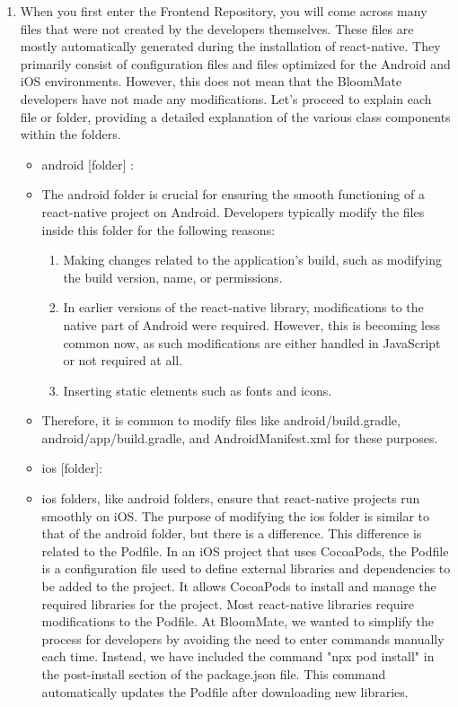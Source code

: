 \documentclass[conference, a4paper]{IEEEtran}
\begin{document}
\begin{enumerate}
\begin{enumerate}
        \item[] When you first enter the Frontend Repository, you will come across many files that were not created by the developers themselves. These files are mostly automatically generated during the installation of react-native. They primarily consist of configuration files and files optimized for the Android and iOS environments. However, this does not mean that the BloomMate developers have not made any modifications. Let's proceed to explain each file or folder, providing a detailed explanation of the various class components within the folders.
        \begin{itemize}
            \item android [folder] :
            \item[] The android folder is crucial for ensuring the smooth functioning of a react-native project on Android. Developers typically modify the files inside this folder for the following reasons:
            \begin{enumerate}
                \item Making changes related to the application's build, such as modifying the build version, name, or permissions.
                \item In earlier versions of the react-native library, modifications to the native part of Android were required. However, this is becoming less common now, as such modifications are either handled in JavaScript or not required at all.
                \item Inserting static elements such as fonts and icons.
            \end{enumerate}
            \item[] Therefore, it is common to modify files like android/build.gradle, android/app/build.gradle, and AndroidManifest.xml for these purposes.\\

            \item ios [folder]:
            \item[]  ios folders, like android folders, ensure that react-native projects run smoothly on iOS. The purpose of modifying the ios folder is similar to that of the android folder, but there is a difference. This difference is related to the Podfile. In an iOS project that uses CocoaPods, the Podfile is a configuration file used to define external libraries and dependencies to be added to the project. It allows CocoaPods to install and manage the required libraries for the project. Most react-native libraries require modifications to the Podfile. At BloomMate, we wanted to simplify the process for developers by avoiding the need to enter commands manually each time. Instead, we have included the command "npx pod install" in the post-install section of the package.json file. This command automatically updates the Podfile after downloading new libraries. \\


\end{itemize}
\end{enumerate}
\end{enumerate}
\end{document}
